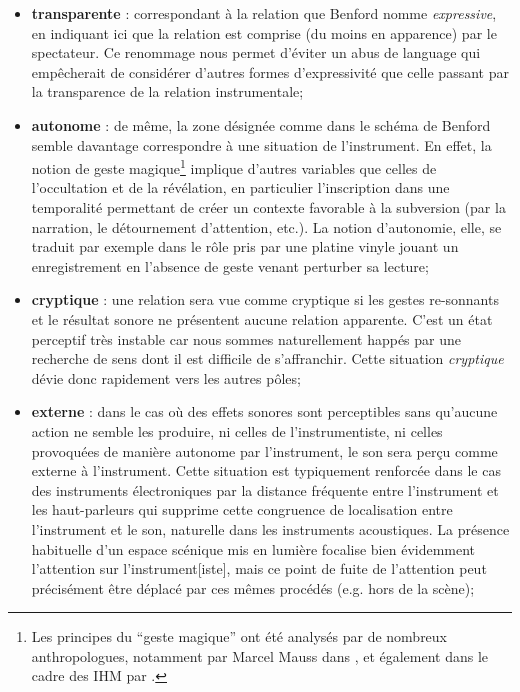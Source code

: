 \begin{itemize}[noitemsep]
	\item \textbf{transparente} : correspondant à la relation que Benford nomme \textit{expressive}, en indiquant ici que la relation est comprise (du moins en apparence) par le spectateur. Ce renommage nous permet d'éviter un abus de language qui empêcherait de considérer d'autres formes d'expressivité que celle passant par la transparence de la relation instrumentale;
	\item \textbf{autonome} : de même, la zone désignée comme  dans le schéma de Benford semble davantage correspondre à une situation  de l'instrument. En effet, la notion de geste magique\footnote{Les principes du ``geste magique'' ont été analysés par de nombreux anthropologues, notamment par Marcel Mauss dans \cite{mauss_esquisse_1902}, et également dans le cadre des \gls{IHM} par \cite{lokuge_dynamic_1995, marshall_deception_2010}.} implique d'autres variables que celles de l'occultation et de la révélation, en particulier l'inscription dans une temporalité permettant de créer un contexte favorable à la subversion (par la narration, le détournement d'attention, etc.). La notion d'autonomie, elle, se traduit par exemple dans le rôle pris par une platine vinyle jouant un enregistrement en l'absence de geste venant perturber sa lecture;
	\item \textbf{cryptique} : une relation sera vue comme cryptique si les gestes re-sonnants et le résultat sonore ne présentent aucune relation apparente. C'est un état perceptif très instable car nous sommes naturellement happés par une recherche de sens dont il est difficile de s'affranchir. Cette situation \textit{cryptique} dévie donc rapidement vers les autres pôles;
	\item \textbf{externe} : dans le cas où des effets sonores sont perceptibles sans qu'aucune action ne semble les produire, ni celles de l'instrumentiste, ni celles provoquées de manière autonome par l'instrument, le son sera perçu comme externe à l'instrument. Cette situation est typiquement renforcée dans le cas des instruments électroniques par la distance fréquente entre l'instrument et les haut-parleurs qui supprime cette congruence de localisation entre l'instrument et le son, naturelle dans les instruments acoustiques. La présence habituelle d'un espace scénique mis en lumière focalise bien évidemment l'attention sur l'instrument[iste], mais ce point de fuite de l'attention peut précisément être déplacé par ces mêmes procédés (e.g. hors de la scène);

\end{itemize}
